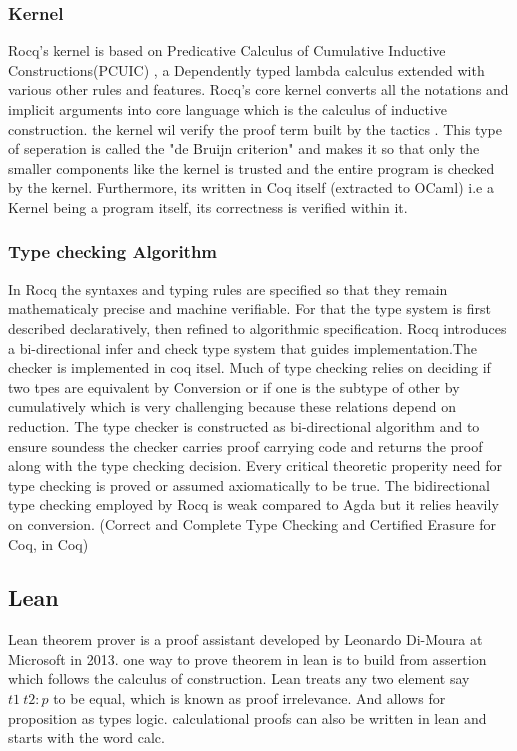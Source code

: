 \documentclass[12pt]{article}
\begin{document}
    \subsubsection{Kernel}

    Rocq's kernel is based on Predicative Calculus of Cumulative Inductive Constructions(PCUIC) , a Dependently typed lambda calculus extended with various other rules and features. Rocq's core kernel converts all the notations and implicit arguments into core language which is the calculus of inductive construction. 
    the kernel wil verify the proof term built by the tactics . This type of seperation is called the "de Bruijn criterion" and makes it so that only the smaller components
    like the kernel is trusted and the entire program is checked by the kernel. Furthermore, its written in Coq itself (extracted to OCaml) i.e a Kernel being a program itself, its correctness is verified within it. \cite{rocq_core_language}

\subsubsection{Type checking Algorithm }
        In Rocq the syntaxes and typing rules are specified so that they remain mathematicaly precise and machine verifiable. For that the type system is first described declaratively, then refined to
        algorithmic specification. Rocq introduces a bi-directional infer and check type system that guides implementation.The checker is implemented in coq itsel. Much of type checking relies on deciding if two tpes are equivalent by Conversion or if one is the subtype of 
        other by cumulatively which is very challenging because these relations depend on reduction. The type checker is constructed as bi-directional algorithm and to ensure soundess the checker carries proof carrying code and returns the proof along with 
        the type checking decision. Every critical theoretic properity need for type checking is proved or assumed axiomatically to be true. The bidirectional type checking employed by Rocq is weak compared to Agda but it relies heavily on conversion. (Correct and Complete Type Checking and Certified Erasure for Coq, in Coq) \cite{type_checking}


\subsection{Lean} 
Lean theorem prover is a proof assistant developed by Leonardo Di-Moura at Microsoft in 2013. one way to prove theorem in lean is to 
build from assertion which follows the calculus of construction. Lean treats any two element say 
$ t1 \ t2: p $ to be equal, which is known as proof irrelevance. And allows for proposition as types logic. calculational proofs can also be written in lean and starts 
with the word calc.  \cite{lean_functional_programming}
\end{document}
